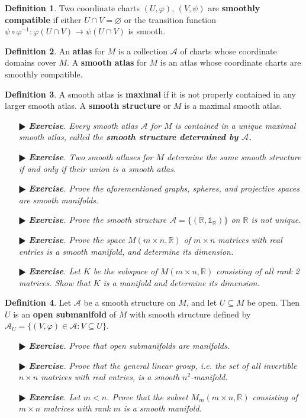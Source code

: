 \documentclass[11pt]{amsart}
\theoremstyle{definition}
\newtheorem*{definition*}{Definition}
\renewcommand\emptyset{\varnothing}
\renewcommand\:{\colon}
\newcommand{\calA}{\mathcal{A}}
\newcommand{\R}{\mathds{R}}
\newcommand{\1}{\mathds{1}}
\newcommand{\exc}[1]{\vspace{-2.5pt}\begin{itemize}[leftmargin=15pt]\item[$\RHD$] \textit{\textbf{Exercise}. #1}\end{itemize}}
\begin{document}
\begin{definition*}
	Two coordinate charts $(U, \varphi)$, $(V, \psi)$ are \textbf{smoothly compatible} if either $U \cap V = \emptyset$ or the transition function $\psi \circ \varphi^{-1}\: \varphi(U \cap V) \to \psi(U \cap V)$ is smooth.
\end{definition*}

\begin{definition*}
	An \textbf{atlas} for $M$ is a collection $\calA$ of charts whose coordinate domains cover $M$. A \textbf{smooth atlas} for $M$ is an atlas whose coordinate charts are smoothly compatible.
\end{definition*}

\begin{definition*}
	A smooth atlas is \textbf{maximal} if it is not properly contained in any larger smooth atlas. A \textbf{smooth structure} or $M$ is a maximal smooth atlas.
\end{definition*}

\exc{Every smooth atlas $\calA$ for $M$ is contained in a unique maximal smooth atlas, called the \textbf{smooth structure determined by $\boldsymbol{\calA}$.}}
\exc{Two smooth atlases for $M$ determine the same smooth structure if and only if their union is a smooth atlas.}
\exc{Prove the aforementioned graphs, spheres, and projective spaces are smooth manifolds.}
\exc{Prove the smooth structure $\calA = \{(\R, \1_\R)\}$ on $\R$ is not unique.}
\exc{Prove the space $M(m \times n, \R)$ of $m \times n$ matrices with real entries is a smooth manifold, and determine its dimension.}
\exc{Let $K$ be the subspace of $M(m \times n, \R)$ consisting of all rank 2 matrices. Show that $K$ is a manifold and determine its dimension.}

\begin{definition*}
	Let $\calA$ be a smooth structure on $M$, and let $U \subseteq M$ be open. Then $U$ is an \textbf{open submanifold} of $M$ with smooth structure defined by $\calA_U = \{(V, \varphi) \in \calA : V \subseteq U\}$.
\end{definition*}

\exc{Prove that open submanifolds are manifolds.}
\exc{Prove that the general linear group, i.e. the set of all invertible $n \times n$ matrices with real entries, is a smooth $n^2$-manifold.}
\exc{Let $m < n$. Prove that the subset $M_m(m \times n, \R)$ consisting of $m \times n$ matrices with rank $m$ is a smooth manifold.}

\vskip20pt
\end{document}
